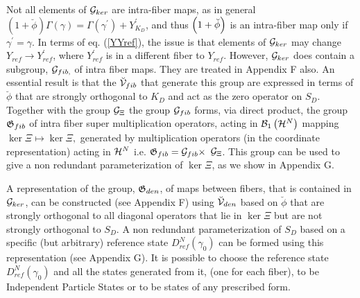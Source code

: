 Not all elements of ${\cal G}_{ker}$ are intra-fiber maps, as in general $%
\left( 1+\breve{\phi}\right) \Gamma \left( \gamma \right) =\Gamma \left(
\gamma ^{\prime }\right) +Y_{K_{D}}^{\prime }$, and thus $\left( 1+\breve{%
\phi}\right) $ is an intra-fiber map only if $\gamma ^{\prime }=\gamma $. In
terms of eq. (\ref{YYref}), the issue is that elements of ${\cal G}_{ker}$
may change $Y_{ref}\rightarrow Y_{ref}^{\prime }$, where $Y_{ref}^{\prime }$
is in a different fiber to $Y_{ref}$. However, ${\cal G}_{ker}$ does contain
a subgroup, ${\cal G}_{fib\text{,}}$ of intra fiber maps. They are treated
in Appendix F also. An essential result is that the ${\cal \breve{V}}_{fib}$
that generate this group are expressed in terms of $\breve{\phi}$ that are
strongly orthogonal to $K_{D}$ and act as the zero operator on $S_{D}$.
Together with the group ${\cal G}_{\Xi }$ the group ${\cal G}_{fib}$ forms,
via direct product, the group ${\frak G}_{fib}$ of intra fiber super
multiplication operators, acting in ${\cal B}_{1}\left( {\cal H}^{N}\right) $
mapping $\ker \Xi \mapsto \ker \Xi ,$ generated by multiplication operators
(in the coordinate representation) acting in ${\cal H}^{N}$ i.e. ${\frak G}%
_{fib}={\cal G}_{fib}\times $ ${\cal G}_{\Xi }$. This group can be used to
give a non redundant parameterization of $\ker \Xi $, as we show in Appendix
G.

A representation of the group, ${\frak G}_{den}$, of maps between fibers,
that is contained in ${\cal G}_{ker}$, can be constructed (see Appendix F)
using ${\cal \breve{V}}_{den}$ based on $\breve{\phi}$ that are strongly
orthogonal to all diagonal operators that lie in $\ker \Xi $ but are not
strongly orthogonal to $S_{D}$. A non redundant parameterization of $S_{D}$
based on a specific (but arbitrary) reference state $D_{ref}^{N}\left(
\gamma _{0}\right) $ can be formed using this representation (see Appendix
G). It is possible to choose the reference state $D_{ref}^{N}\left( \gamma
_{0}\right) $ and all the states generated from it, (one for each fiber), to
be Independent Particle States or to be states of any prescribed form.

